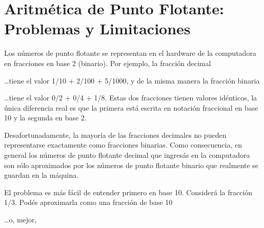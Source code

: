 \documentclass[a4,10pt,spanish]{sphinxmanual}
\begin{document}
\chapter{Aritmética de Punto Flotante: Problemas y Limitaciones}
\label{\detokenize{tutorial/floatingpoint:floating-point-arithmetic-issues-and-limitations}}\label{\detokenize{tutorial/floatingpoint:tut-fp-issues}}\label{\detokenize{tutorial/floatingpoint::doc}}
\sphinxAtStartPar
Los números de punto flotante se representan en el hardware de la computadora en fracciones en base 2 (binario).  Por ejemplo, la fracción decimal

\begin{sphinxVerbatim}[commandchars=\\\{\}]
\end{sphinxVerbatim}

\sphinxAtStartPar
…tiene el valor 1/10 + 2/100 + 5/1000, y de la misma manera la fracción binaria

\begin{sphinxVerbatim}[commandchars=\\\{\}]
\end{sphinxVerbatim}

\sphinxAtStartPar
…tiene el valor 0/2 + 0/4 + 1/8.  Estas dos fracciones tienen valores idénticos, la única diferencia real es que la primera está escrita en notación fraccional en base 10 y la segunda en base 2.

\sphinxAtStartPar
Desafortunadamente, la mayoría de las fracciones decimales no pueden representarse exactamente como fracciones binarias.  Como consecuencia, en general los números de punto flotante decimal que ingresás en la computadora son sólo aproximados por los números de punto flotante binario que realmente se guardan en la máquina.

\sphinxAtStartPar
El problema es más fácil de entender primero en base 10.  Considerá la fracción 1/3.  Podés aproximarla como una fracción de base 10

\begin{sphinxVerbatim}[commandchars=\\\{\}]
\end{sphinxVerbatim}

\sphinxAtStartPar
…o, mejor,

\begin{sphinxVerbatim}[commandchars=\\\{\}]
\end{sphinxVerbatim}
\end{document}
